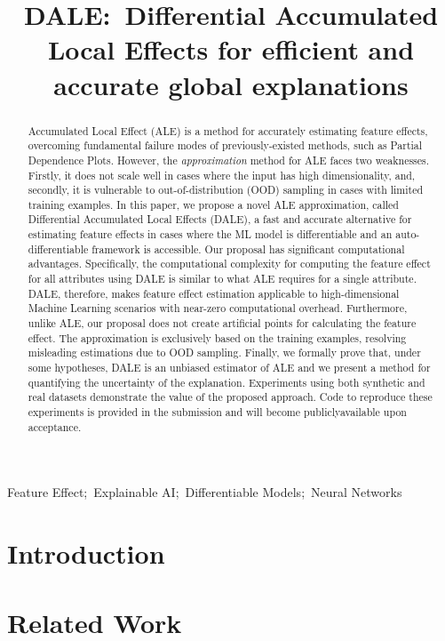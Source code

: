 \documentclass[wcp]{jmlr}
\title[DALE:~Differential Accumulated Local Effects]{DALE:~Differential Accumulated Local Effects for efficient and accurate global explanations}
\begin{document}
\maketitle

\begin{abstract}
  Accumulated Local Effect (ALE) is a method for accurately estimating
  feature effects, overcoming fundamental failure modes of
  previously-existed methods, such as Partial Dependence
  Plots. However, the \textit{approximation} method for ALE faces two
  weaknesses. Firstly, it does not scale well in cases where the input
  has high dimensionality, and, secondly, it is vulnerable to
  out-of-distribution (OOD) sampling in cases with limited training
  examples. In this paper, we propose a novel ALE approximation,
  called Differential Accumulated Local Effects (DALE), a fast and
  accurate alternative for estimating feature effects in cases where
  the ML model is differentiable and an auto-differentiable framework
  is accessible. Our proposal has significant computational
  advantages. Specifically, the computational complexity for computing
  the feature effect for all attributes using DALE is similar to what
  ALE requires for a single attribute. DALE, therefore, makes feature
  effect estimation applicable to high-dimensional Machine Learning
  scenarios with near-zero computational overhead. Furthermore, unlike
  ALE, our proposal does not create artificial points for calculating
  the feature effect. The approximation is exclusively based on the
  training examples, resolving misleading estimations due to OOD
  sampling. Finally, we formally prove that, under some hypotheses,
  DALE is an unbiased estimator of ALE and we present a method for
  quantifying the uncertainty of the explanation. Experiments using
  both synthetic and real datasets demonstrate the value of the
  proposed approach. Code to reproduce these experiments is provided
  in the submission and will become publiclyavailable upon acceptance.
\end{abstract}
\begin{keywords}
Feature Effect;~Explainable AI;~Differentiable Models;~Neural Networks
\end{keywords}

\section{Introduction}

\label{sec:1-introduction}

\section{Related Work}

\label{sec:2-related}
\end{document}
